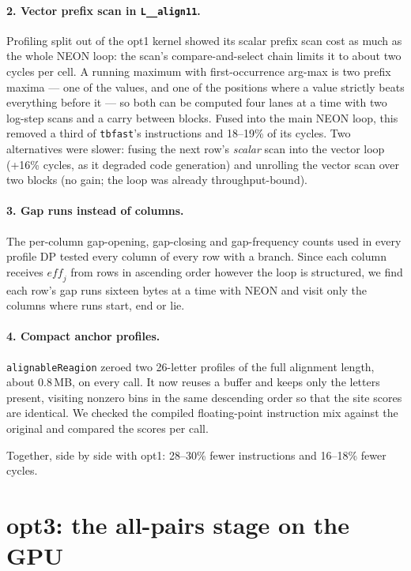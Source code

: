 \documentclass[11pt]{article}
\newcommand{\code}[1]{\texttt{#1}}
\begin{document}
\paragraph{2. Vector prefix scan in \code{L\_\_align11}.} Profiling split out of the opt1
kernel showed its scalar prefix scan cost as much as the whole NEON loop: the scan's
compare-and-select chain limits it to about two cycles per cell. A running maximum with
first-occurrence arg-max is two prefix maxima --- one of the values, and one of the
positions where a value strictly beats everything before it --- so both can be computed
four lanes at a time with two log-step scans and a carry between blocks. Fused into the
main NEON loop, this removed a third of \code{tbfast}'s instructions and 18--19\% of its
cycles. Two alternatives were slower: fusing the next row's \emph{scalar} scan into the
vector loop (+16\% cycles, as it degraded code generation) and unrolling the vector scan
over two blocks (no gain; the loop was already throughput-bound).

\paragraph{3. Gap runs instead of columns.} The per-column gap-opening, gap-closing and
gap-frequency counts used in every profile DP tested every column of every row with a
branch. Since each column receives $\mathit{eff}_j$ from rows in ascending order however
the loop is structured, we find each row's gap runs sixteen bytes at a time with NEON and
visit only the columns where runs start, end or lie.

\paragraph{4. Compact anchor profiles.} \code{alignableReagion} zeroed two
26-letter profiles of the full alignment length, about 0.8\,MB, on every call. It now
reuses a buffer and keeps only the letters present, visiting nonzero bins in the same
descending order so that the site scores are identical. We checked the compiled floating-point
instruction mix against the original and compared the scores per call.

Together, side by side with opt1: 28--30\% fewer instructions and 16--18\% fewer cycles.

\section{opt3: the all-pairs stage on the GPU}
\label{sec:gpu}
\end{document}
